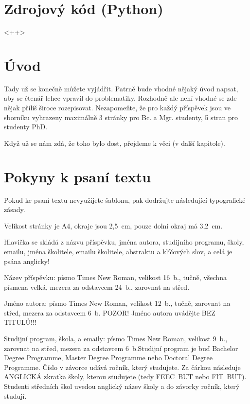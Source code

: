 \documentclass{eeict}
\begin{document}
\nocite{fenicsbook}
\nocite{brenner_scott}
%



%
\appendix
\section{Zdrojový kód (Python)}<++>

%


\label{LastPage}
\section{Úvod}

Tady už se konečně můžete vyjádřit. Patrně bude vhodné nějaký úvod napsat,
aby se čtenář lehce vpravil do problematiky. Rozhodně ale není vhodné se
zde nějak příliš široce rozepisovat. Nezapomeňte, že pro každý příspěvek
jsou ve sborníku vyhrazeny maximálně 3 stránky pro Bc. a Mgr. studenty,
5 stran pro studenty PhD.

Když už se nám zdá, že toho bylo dost, přejdeme k věci (v další kapitole).


\section{Pokyny k psaní textu}

Pokud ke psaní textu nevyužijete šablonu, pak dodržujte následující typografické
zásady.

Velikost stránky je A4, okraje jsou 2,5~cm, pouze dolní okraj má 3,2~cm.

Hlavička se skládá z názvu příspěvku, jména autora, studijního programu, školy, 
emailu, jména školitele, emailu školitele, abstraktu a klíčových slov, a celá je
psána anglicky!

Název příspěvku: písmo Times New Roman, velikost 16~b., tučně, všechna písmena
velká, mezera za odstavcem 24~b., zarovnat na střed.

Jméno autora: písmo Times New Roman, velikost 12~b., tučně, zarovnat na střed,
mezera za odstavcem 6~b. POZOR! Jméno autora uvádějte BEZ TITULŮ!!!
                      
Studijní program, škola, a emaily: písmo Times New Roman, velikost 9~b.,
zarovnat na střed, mezera za odstavcem 6~b.Studijní program je buď 
Bachelor Degree Programme, Master Degree Programme nebo Doctoral Degree 
Programme. Číslo v závorce udává ročník, který studujete. Za čárkou následuje
ANGLICKÁ zkratka školy, kterou studujete (tedy FEEC~BUT nebo FIT~BUT).
Studenti středních škol uvedou anglický název školy a do závorky ročník,
který studují.
\end{document}
